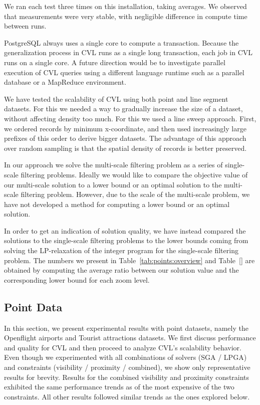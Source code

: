 We ran each test three times on this installation, taking averages. We observed that measurements were very stable, with negligible difference in compute time between runs.

PostgreSQL always uses a single core to compute a transaction. Because the generalization process in CVL runs as a single long transaction, each job in CVL runs on a single core. A future direction would be to investigate parallel execution of CVL queries using a different language runtime such as a parallel database or a MapReduce environment.


We have tested the scalability of CVL using both point and line segment datasets. For this we needed a way to gradually increase the size of a dataset, without affecting density too much.  For this we used a line sweep approach. First, we ordered records by minimum x-coordinate, and then used increasingly large prefixes of this order to derive bigger datasets. The advantage of this approach over random sampling is that the spatial density of records is better preserved.

In our approach we solve the multi-scale filtering problem as a series of single-scale filtering problems. Ideally we would like to compare the objective value of our multi-scale solution to a lower bound or an optimal solution to the multi-scale filtering problem. However, due to the scale of the multi-scale problem, we have not developed a method for computing a lower bound or an optimal solution.

In order to get an indication of solution quality, we have instead compared the solutions to the single-scale filtering problems to the lower bounds coming from solving the LP-relaxation of the integer program for the single-scale filtering problem. The numbers we present in Table~\ref{tab:points:overview} and Table~\ref{} are obtained by computing the average ratio between our solution value and the corresponding lower bound for each zoom level. 

\subsection{Point Data}
\label{sec:exp:points}

In this section, we present experimental results with point datasets, namely the Openflight airports and Tourist attractions datasets. We first discuss performance and quality for CVL and then proceed to analyze CVL's scalability behavior. Even though we experimented with all combinations of solvers (SGA / LPGA) and constraints (visibility / proximity / combined), we show only representative results for brevity. Results for the combined visibility and proximity constraints exhibited the same performance trends as of the most expensive of the two constraints. All other results followed similar trends as the ones explored below.

